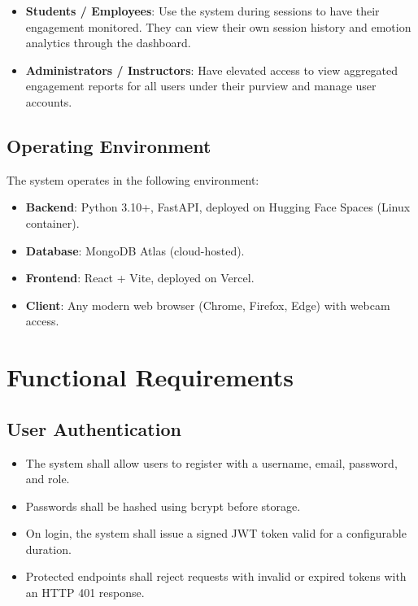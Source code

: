 \begin{itemize}
    \item \textbf{Students / Employees}: Use the system during sessions to
          have their engagement monitored. They can view their own session
          history and emotion analytics through the dashboard.
    \item \textbf{Administrators / Instructors}: Have elevated access to
          view aggregated engagement reports for all users under their
          purview and manage user accounts.
\end{itemize}

\subsection{Operating Environment}

The system operates in the following environment:
\begin{itemize}
    \item \textbf{Backend}: Python 3.10+, FastAPI, deployed on Hugging Face
          Spaces (Linux container).
    \item \textbf{Database}: MongoDB Atlas (cloud-hosted).
    \item \textbf{Frontend}: React + Vite, deployed on Vercel.
    \item \textbf{Client}: Any modern web browser (Chrome, Firefox, Edge)
          with webcam access.
\end{itemize}

\section{Functional Requirements}

\subsection{User Authentication}
\begin{itemize}
    \item The system shall allow users to register with a username, email,
          password, and role.
    \item Passwords shall be hashed using bcrypt before storage.
    \item On login, the system shall issue a signed JWT token valid for a
          configurable duration.
    \item Protected endpoints shall reject requests with invalid or expired
          tokens with an HTTP 401 response.
\end{itemize}

